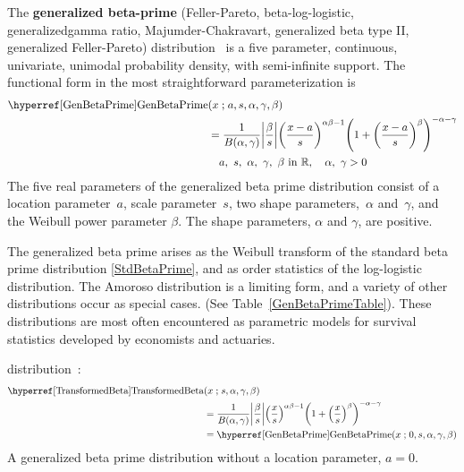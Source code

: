 

\label{sec:GenBetaPrime}
{} 
The {\bf generalized beta-prime} (Feller-Pareto, beta-log-logistic, generalized\linebreak gamma ratio, Majumder-Chakravart, generalized beta type II, generalized Feller-Pareto)  distribution~\cite{Feller1971, McDonald1984, Tahmasebi2010} is a five parameter,  continuous, univariate, unimodal probability density, with semi-infinite support. The functional form in the most straightforward parameterization is
\begin{align}
\label{GenBetaPrime}
\opr{GenBetaPrime}&(x\given a, s, \alpha,\gamma,\beta) \\
& =
 \frac{1}{B(\alpha, \gamma)} \Left|\frac{\beta}{s}\Right|
\Left(\frac{x-a}{s}\Right)^{\alpha\beta -1} \Left(1+ \Left(\frac{x-a}{s}\Right)^\beta \Right)^{-\alpha-\gamma }
\notag
\checked
\\ & \quad a,\ s,\ \alpha,\ \gamma,\ \beta \text{ in } \mathbb{R},\quad  \alpha,\ \gamma >0
\notag
\end{align}
The five real parameters of the generalized beta prime distribution consist of a location parameter~$a$, 
scale parameter~$s$, two shape parameters,~$\alpha$ and~$\gamma$, and the Weibull power parameter $\beta$. The shape parameters, $\alpha$ and $\gamma$, are positive.


The generalized beta prime arises as the Weibull transform of the standard beta prime distribution \eqref{StdBetaPrime}, and as order statistics of the log-logistic distribution. The Amoroso distribution is a limiting form, and a variety of other distributions occur as special cases. (See Table~\ref{GenBetaPrimeTable}).  These distributions are most often encountered as parametric models for survival statistics developed by  economists and actuaries.







 distribution~\cite{McDonald1984,Klugman2012}:
\begin{align}
\label{TransformedBeta}
\opr{TransformedBeta}&(x\given s, \alpha,\gamma,\beta) 
\\ \notag & =
 \frac{1}{B(\alpha, \gamma)} \Left|\frac{\beta}{s}\Right|
\Left(\frac{x}{s}\Right)^{\alpha\beta -1} \Left(1+ \Left(\frac{x}{s}\Right)^\beta \Right)^{-\alpha-\gamma }
\checked
\\ \notag &= \opr{GenBetaPrime}(x\given 0, s, \alpha,\gamma,\beta) 
\checked
\end{align}
A generalized beta prime distribution without a location parameter, $a=0$.


